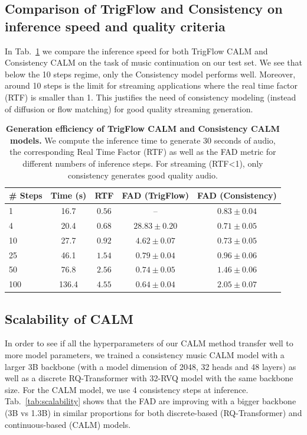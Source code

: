 \subsection{Comparison of TrigFlow and Consistency on inference speed and quality criteria}
\label{sec:num_steps}
In Tab.~\ref{tab:num_steps} we compare the inference speed for both TrigFlow CALM and Consistency CALM on the task of music continuation on our test set. We see that below the 10 steps regime, only the Consistency model performs well. Moreover, around 10 steps is the limit for streaming applications where the real time factor (RTF) is smaller than 1. This justifies the need of consistency modeling (instead of diffusion or flow matching) for good quality streaming generation.

\begin{table}[h]
\caption{ \textbf{Generation efficiency of TrigFlow CALM and Consistency CALM models.} 
We compute the inference time to generate 30 seconds of audio, the corresponding Real Time Factor (RTF) as well as the FAD metric for different numbers of inference steps. For streaming (RTF<1), only consistency generates good quality audio.}
\centering
\renewcommand{\arraystretch}{1.1}

\begin{tabular}{lcccc}
\toprule
\textbf{\# Steps} & \textbf{Time (s)} & \textbf{RTF} & \textbf{FAD (TrigFlow)} & \textbf{FAD (Consistency)} \\
\midrule
1   & 16.7  & $0.56$ & --            & $0.83 \pm 0.04$ \\
4   & 20.4  & $0.68$ & $28.83 \pm 0.20$ & $0.71 \pm 0.05$ \\
10  & 27.7  & $0.92$ & $4.62 \pm 0.07$  & $0.73 \pm 0.05$ \\
25  & 46.1  & $1.54$ & $0.79 \pm 0.04$  & $0.96 \pm 0.06$ \\
50  & 76.8  & $2.56$ & $0.74 \pm 0.05$  & $1.46 \pm 0.06$ \\
100 & 136.4 & $4.55$ & $0.64 \pm 0.04$  & $2.05 \pm 0.07$ \\
\bottomrule
\end{tabular}

\label{tab:num_steps}
\end{table}

\subsection{Scalability of CALM}
\label{sec:scalability}
In order to see if all the hyperparameters of our CALM method transfer well to more model parameters, we trained a consistency music CALM model with a larger 3B backbone (with a model dimension of 2048, 32 heads and 48 layers) as well as a discrete RQ-Transformer with 32-RVQ model with the same backbone size. For the CALM model, we use 4 consistency steps at inference. Tab.~\ref{tab:scalability} shows that the FAD are improving with a bigger backbone (3B vs 1.3B) in similar proportions for both discrete-based (RQ-Transformer) and continuous-based (CALM) models. 


